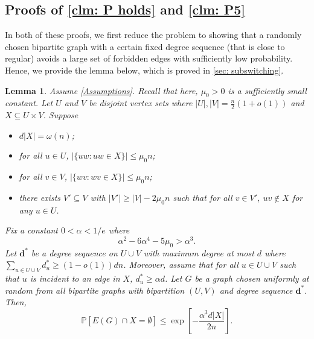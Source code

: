 \documentclass[11pt]{article}
\def\P{\mathbb P}
\theoremstyle{plain}
\newtheorem{lem}[thm]{Lemma}
\begin{document}
\subsection{Proofs of \cref{clm: P holds} and \cref{clm: P5}}\label{sec: expansion}
In both of these proofs, we first reduce the problem to showing that a randomly chosen bipartite graph with a certain fixed degree sequence (that is close to regular) avoids a large set of forbidden edges with sufficiently low probability. Hence, we provide the lemma below, which is proved in \cref{sec: subswitching}.
\begin{lem}\label{lem: switching} Assume \eqref{Assumptions}. Recall that here, $\mu_0 > 0$ is a sufficiently small constant. Let $U$ and $V$ be disjoint vertex sets where $|U|, |V| = \frac{n}{2}(1 + o(1))$ and $X \subseteq U \times V$. Suppose  
\begin{itemize}
    \item[(1)] $d|X| = \omega(n)$;
    \item[(2)] for all $u \in U$, $|\{uw \mathrel : uw \in X\}| \leq \mu_0n$;
    \item[(3)] for all $v \in V$, $|\{wv \mathrel : wv \in X\}| \leq \mu_0n$;
    \item[(4)] there exists $V' \subseteq V$ with $|V'| \geq |V| - 2\mu_0n$ such that for all $v \in V'$, $uv \notin X$ for any $u \in U$.
\end{itemize}    Fix a constant $0 < \alpha < 1/e$ where 
\begin{equation}\label{eq: alpha condition}
    \alpha^2 - 6\alpha^4 - 5\mu_0 > \alpha^3.
\end{equation} 
Let $\mathbf d^*$ be a degree sequence on $U \cup V$ with maximum degree at most $d$ where $\sum_{u \in U \cup V}d^*_u \geq (1 - o(1))dn$. Moreover, assume that for all $u \in U \cup V$ such that $u$ is incident to an edge in $X$, $d^*_u \geq \alpha d$. Let $G$ be a graph chosen uniformly at random from all bipartite graphs with bipartition $(U,V)$ and degree sequence $\mathbf d^*$. Then, 
    \[
    \P[E(G) \cap X = \emptyset]\leq \exp\left[ -\frac{\alpha^3d|X|}{2n}\right].
    \]
\end{lem}
\end{document}
